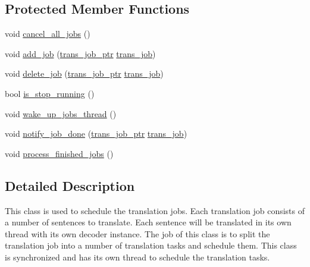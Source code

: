 \subsection*{Protected Member Functions}
\begin{DoxyCompactItemize}
\item 
void \hyperlink{classuva_1_1smt_1_1bpbd_1_1server_1_1trans__job__pool_a37f5a4197b3813daaf25ff51adbedeac}{cancel\+\_\+all\+\_\+jobs} ()
\item 
void \hyperlink{classuva_1_1smt_1_1bpbd_1_1server_1_1trans__job__pool_a557da35b4def5a927fab613adb977286}{add\+\_\+job} (\hyperlink{namespaceuva_1_1smt_1_1bpbd_1_1server_acb76132c82e66b5dbf7e3aa0e5af2580}{trans\+\_\+job\+\_\+ptr} \hyperlink{classuva_1_1smt_1_1bpbd_1_1server_1_1trans__job}{trans\+\_\+job})
\item 
void \hyperlink{classuva_1_1smt_1_1bpbd_1_1server_1_1trans__job__pool_ae59be0b8eb6e2f78a79912ace9be2963}{delete\+\_\+job} (\hyperlink{namespaceuva_1_1smt_1_1bpbd_1_1server_acb76132c82e66b5dbf7e3aa0e5af2580}{trans\+\_\+job\+\_\+ptr} \hyperlink{classuva_1_1smt_1_1bpbd_1_1server_1_1trans__job}{trans\+\_\+job})
\item 
bool \hyperlink{classuva_1_1smt_1_1bpbd_1_1server_1_1trans__job__pool_a6e442f963de1dde69c1c60ba2e3b6e70}{is\+\_\+stop\+\_\+running} ()
\item 
void \hyperlink{classuva_1_1smt_1_1bpbd_1_1server_1_1trans__job__pool_a826c44d20e2c2999cbe0a353cb7f7abe}{wake\+\_\+up\+\_\+jobs\+\_\+thread} ()
\item 
void \hyperlink{classuva_1_1smt_1_1bpbd_1_1server_1_1trans__job__pool_a5017ac559701b10345439c2ad1c915f8}{notify\+\_\+job\+\_\+done} (\hyperlink{namespaceuva_1_1smt_1_1bpbd_1_1server_acb76132c82e66b5dbf7e3aa0e5af2580}{trans\+\_\+job\+\_\+ptr} \hyperlink{classuva_1_1smt_1_1bpbd_1_1server_1_1trans__job}{trans\+\_\+job})
\item 
void \hyperlink{classuva_1_1smt_1_1bpbd_1_1server_1_1trans__job__pool_a3c9d5b9d5077313b09efac8d662e3311}{process\+\_\+finished\+\_\+jobs} ()
\end{DoxyCompactItemize}


\subsection{Detailed Description}
This class is used to schedule the translation jobs. Each translation job consists of a number of sentences to translate. Each sentence will be translated in its own thread with its own decoder instance. The job of this class is to split the translation job into a number of translation tasks and schedule them. This class is synchronized and has its own thread to schedule the translation tasks. 

